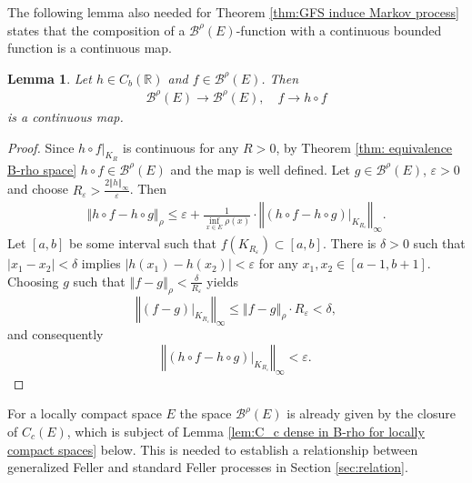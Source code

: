 \documentclass[a4paper,12pt]{article}
\newtheorem{lemma}[theorem]{Lemma}
\theoremstyle{definition}
\theoremstyle{remark}
\numberwithin{equation}{section}
\numberwithin{theorem}{section}
\begin{document}
The following lemma also needed for Theorem \ref{thm:GFS induce Markov process} states that the composition of a $\mathcal{\mathscr{B}}^{\rho}(E)$-function  with a continuous bounded function is a continuous map.


\begin{lemma}
\label{lem:composition B-rho is continuous} Let $h\in C_{b}(\mathbb{R})$
and $f\in\mathcal{\mathscr{B}}^{\rho}(E)$. Then 
\begin{align*}
\mathcal{\mathscr{B}}^{\rho}(E)  \rightarrow\mathcal{\mathscr{B}}^{\rho}(E), \quad
f  \rightarrow h\circ f
\end{align*}
is a continuous map. 
\end{lemma}

\begin{proof}
Since $\left.h\circ f\right|_{K_{R}}$ is continuous for any $R>0$,
by Theorem \ref{thm: equivalence B-rho space} $h\circ f\in\mathcal{\mathscr{B}}^{\rho}(E)$ and the map is well defined. Let $g\in\mathcal{\mathscr{B}}^{\rho}(E)$,
$\varepsilon>0$ and choose $R_{\varepsilon}>\frac{2\left\Vert h\right\Vert _{\infty}}{\varepsilon}$.
Then 
\begin{align*}
\left\Vert h\circ f-h\circ g\right\Vert _{\rho} \leq\varepsilon+\frac{1}{\underset{x\in E}{\inf}\rho(x)}\cdot\left\Vert \left.\left(h\circ f-h\circ g\right)\right|_{K_{R_{\varepsilon}}}\right\Vert _{\infty}.
\end{align*}
Let $\left[a,b\right]$ be some interval such that $f(K_{R_{\varepsilon}})\subset\left[a,b\right]$. There is $\delta>0$ such that  $\left|x_{1}-x_{2}\right|<\delta$
implies $\left|h(x_{1})-h(x_{2})\right|<\varepsilon$ for
any $x_{1},x_{2}\in\left[a-1,b+1\right]$. Choosing $g$ such that $\left\Vert f-g\right\Vert _{\rho}<\frac{\delta}{R_{\varepsilon}}$
yields
\[
\left\Vert \left.\left(f-g\right)\right|_{K_{R_{\varepsilon}}}\right\Vert _{\infty}\leq\left\Vert f-g\right\Vert _{\rho}\cdot R_{\varepsilon}<\delta,
\]
 and consequently
\[
\left\Vert \left.\left(h\circ f-h\circ g\right)\right|_{K_{R_{\varepsilon}}}\right\Vert _{\infty}<\varepsilon.
\]

\end{proof}


For a locally compact space $E$ the space $\mathcal{\mathscr{B}}^{\rho}(E)$ is already given by the closure of $C_c(E)$, which is subject of Lemma \ref{lem:C_c dense in  B-rho for locally compact spaces} below. This is needed to establish a relationship between generalized Feller and standard Feller processes in Section \ref{sec:relation}.
\end{document}

